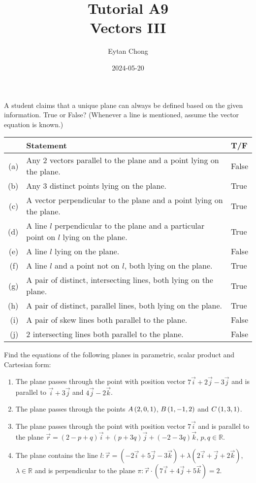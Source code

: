 \documentclass{echw}
\title{Tutorial A9\\Vectors III}
\author{Eytan Chong}
\date{2024-05-20}
\begin{document}
    \problem{}
        A student claims that a unique plane can always be defined based on the given information. True or False? (Whenever a line is mentioned, assume the vector equation is known.)

        \begin{table}[h]
            \centering
            \begin{tabularx}{\textwidth}{r X l}
            & \textbf{Statement} & \textbf{T/F}\\\hline
            (a) & Any 2 vectors parallel to the plane and a point lying on the plane. & False \\
            (b) & Any 3 distinct points lying on the plane. & True \\
            (c) & A vector perpendicular to the plane and a point lying on the plane. & True\\
            (d) & A line $l$ perpendicular to the plane and a particular point on $l$ lying on the plane. & True\\
            (e) & A line $l$ lying on the plane. & False\\
            (f) & A line $l$ and a point not on $l$, both lying on the plane. & True\\
            (g) & A pair of distinct, intersecting lines, both lying on the plane. & True\\
            (h) & A pair of distinct, parallel lines, both lying on the plane. & True\\
            (i) & A pair of skew lines both parallel to the plane. & False\\
            (j) & 2 intersecting lines both parallel to the plane. & False
            \end{tabularx}
        \end{table}

    \problem{}
        Find the equations of the following planes in parametric, scalar product and Cartesian form:

        \begin{enumerate}
            \item The plane passes through the point with position vector $7\vec i + 2 \vec j -3\vec j$ and is parallel to $\vec i + 3\vec j$ and $4\vec j - 2\vec k$.
            \item The plane passes through the points $A\left(2, 0, 1\right)$, $B\left(1, -1, 2\right)$ and $C\left(1, 3, 1\right)$.
            \item The plane passes through the point with position vector $7\vec i$ and is parallel to the plane $\vec r = (2 - p + q)\vec i + (p + 3q)\vec j + (-2-3q)\vec k$, $p, q \in \mathbb{R}$.
            \item The plane contains the line $l : \vec r = (-2\vec i + 5\vec j -3\vec k) + \lambda(2\vec i + \vec j + 2\vec k)$, $\lambda \in \mathbb{R}$ and is perpendicular to the plane $\pi : \vec r \cdot (7\vec i + 4\vec j + 5\vec k) = 2$.
        \end{enumerate}
\end{document}
